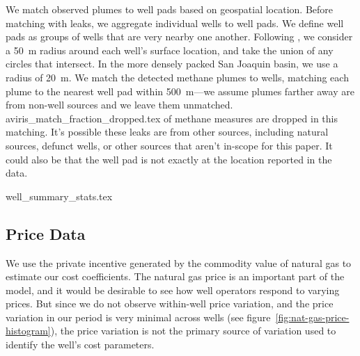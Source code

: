 \documentclass[12pt,oneside,letterpaper]{article}
\theoremstyle{definition}
\begin{document}
\begin{refsection}
We match observed plumes to well pads based on geospatial location.
Before matching with leaks, we aggregate individual wells to well pads.
We define well pads as groups of wells that are very nearby one another.
Following \textcite{Omara/Zimmerman/Sullivan/Li/Ellis/Cesa/Subramanian/Presto/Robinson:2018}, we consider a 50~m radius around each well's surface location, and take the union of any circles that intersect.
In the more densely packed San Joaquin basin, we use a radius of 20~m.
We match the detected methane plumes to wells, matching each plume to the nearest well pad within 500~m---we assume plumes farther away are from non-well sources and we leave them unmatched.
{aviris_match_fraction_dropped.tex}
of methane measures are dropped in this matching.
It's possible these leaks are from other sources, including natural sources, defunct wells, or other sources that aren't in-scope for this paper.
It could also be that the well pad is not exactly at the location reported in the data.


\begin{table}[!hbtp]
\centering
{well_summary_stats.tex}
\end{table}



\subsection{Price Data}
\label{sec:price-data}

We use the private incentive generated by the commodity value of natural gas to estimate our cost coefficients.
The natural gas price is an important part of the model, and it would be desirable to see how well operators respond to varying prices.
But since we do not observe within-well price variation, and the price variation in our period is very minimal across wells (see figure~\ref{fig:nat-gas-price-histogram}), the price variation is not the primary source of variation used to identify the well’s cost parameters.


\end{refsection}
\end{document}
